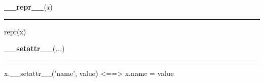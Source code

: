     \label{object:__repr__}

    \vspace{0.5ex}

    \begin{boxedminipage}{\textwidth}

    \raggedright \textbf{\_\_repr\_\_}(\textit{x})

    \vspace{-1.5ex}

    \rule{\textwidth}{0.5\fboxrule}

repr(x)
    \vspace{1ex}

    \end{boxedminipage}

    \label{object:__setattr__}

    \vspace{0.5ex}

    \begin{boxedminipage}{\textwidth}

    \raggedright \textbf{\_\_setattr\_\_}(\textit{...})

    \vspace{-1.5ex}

    \rule{\textwidth}{0.5\fboxrule}

x.{\_}{\_}setattr{\_}{\_}('name', value) {\textless}=={\textgreater} x.name = value
    \vspace{1ex}

    \end{boxedminipage}

    \label{peach:nn:base:Layer:__setitem__}

    \vspace{0.5ex}

